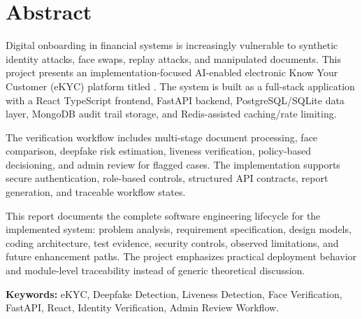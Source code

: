 \chapter*{Abstract}

Digital onboarding in financial systems is increasingly vulnerable to synthetic identity attacks, face swaps, replay attacks, and manipulated documents. This project presents an implementation-focused AI-enabled electronic Know Your Customer (eKYC) platform titled \textbf{\projecttitle}. The system is built as a full-stack application with a React TypeScript frontend, FastAPI backend, PostgreSQL/SQLite data layer, MongoDB audit trail storage, and Redis-assisted caching/rate limiting.

The verification workflow includes multi-stage document processing, face comparison, deepfake risk estimation, liveness verification, policy-based decisioning, and admin review for flagged cases. The implementation supports secure authentication, role-based controls, structured API contracts, report generation, and traceable workflow states.

This report documents the complete software engineering lifecycle for the implemented system: problem analysis, requirement specification, design models, coding architecture, test evidence, security controls, observed limitations, and future enhancement paths. The project emphasizes practical deployment behavior and module-level traceability instead of generic theoretical discussion.

\textbf{Keywords:} eKYC, Deepfake Detection, Liveness Detection, Face Verification, FastAPI, React, Identity Verification, Admin Review Workflow.

\newpage
